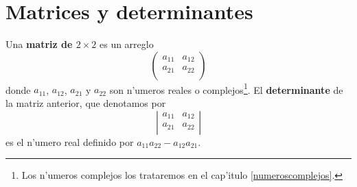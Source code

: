 \section{Matrices y determinantes}
\label{cap1sec1}

\noindent Una {\bf matriz de $2\times 2$} es un arreglo 
$$
     \left (\begin{array}{cc}
                 a_{11} &  a_{12}\\[1mm]
                 a_{21} &  a_{22}\\[1mm]
              \end{array}\right )
$$
donde $a_{11}$, $a_{12}$, $a_{21}$ y $a_{22}$ son n'umeros reales o 
complejos\footnote{Los n'umeros complejos los trataremos en el cap'itulo   \ref{numeroscomplejos}.}. 
\noindent El {\bf determinante} de la matriz anterior,  que denotamos por
$$
     \left |\begin{array}{cc}
                 a_{11} &  a_{12}\\[1mm]
                 a_{21} &  a_{22}\\[1mm]
              \end{array}\right |
$$
es el n'umero real definido por 
$a_{11}a_{22}- a_{12}a_{21}.$

\vei

